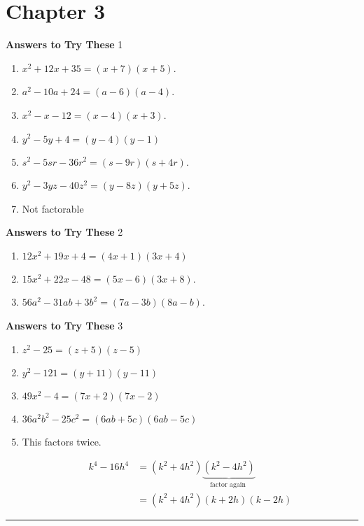 \documentclass[a4paper]{JAC2003}
\begin{document}
\section{Chapter 3}

\noindent\textcolor{red!75!black}{\textbf{Answers to Try These}} 1
\begin{enumerate}
\item $x^{2}+12 x+35=(x+7)(x+5)$.

\item $a^{2}-10 a+24=(a-6)(a-4)$.

\item $x^{2}-x-12=(x-4)(x+3)$.

\item $y^{2}-5 y+4=(y-4)(y-1)$

\item $s^{2}-5 s r-36 r^{2}=(s-9 r)(s+4 r)$.

\item $y^{2}-3 y z-40 z^{2}=(y-8 z)(y+5 z)$.

\item Not factorable
\end{enumerate}

\noindent\textcolor{red!75!black}{\textbf{Answers to Try These}} 2
\begin{enumerate}
\item $12 x^{2}+19 x+4=(4 x+1)(3 x+4)$

\item $15 x^{2}+22 x-48=(5 x-6)(3 x+8)$. %

\item $56 a^{2}-31 a b+3 b^{2}=(7 a-3 b)(8 a-b)$.
\end{enumerate}

\noindent\textcolor{red!75!black}{\textbf{Answers to Try These}} 3
\begin{enumerate}
\item $z^{2}-25=(z+5)(z-5)$

\item $y^{2}-121=(y+11)(y-11)$

\item $49 x^{2}-4=(7 x+2)(7 x-2)$

\item $36 a^{2} b^{2}-25 c^{2}=(6 a b+5 c)(6 a b-5 c)$

\item This factors twice.

$$
\begin{aligned}
k^{4}-16 h^{4} &=\left(k^{2}+4 h^{2}\right) \underbrace{\left(k^{2}-4 h^{2}\right)}_{\text {factor again }} \\
&=\left(k^{2}+4 h^{2}\right)(k+2 h)(k-2 h)
\end{aligned}
$$
\end{enumerate}
\noindent\rule[0.5ex]{\linewidth}{1pt}
\end{document}
